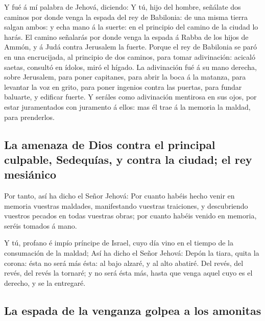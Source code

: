  Y fué á mí palabra de Jehová, diciendo: 
Y tú, hijo del hombre, señálate dos caminos por donde venga la espada
del rey de Babilonia: de una misma tierra salgan ambos: y echa mano á la
suerte: en el principio del camino de la ciudad lo harás.
 El camino señalarás por donde venga la espada á Rabba de
los hijos de Ammón, y á Judá contra Jerusalem la fuerte. 
Porque el rey de Babilonia se paró en una encrucijada, al principio de
dos caminos, para tomar adivinación: acicaló saetas, consultó en ídolos,
miró el hígado.  La adivinación fué á su mano derecha,
sobre Jerusalem, para poner capitanes, para abrir la boca á la matanza,
para levantar la voz en grito, para poner ingenios contra las puertas,
para fundar baluarte, y edificar fuerte.  Y seráles como
adivinación mentirosa en sus ojos, por estar juramentados con juramento
á ellos: mas él trae á la memoria la maldad, para prenderlos.

\hypertarget{la-amenaza-de-dios-contra-el-principal-culpable-sedequuxedas-y-contra-la-ciudad-el-rey-mesiuxe1nico}{%
\subsection{La amenaza de Dios contra el principal culpable, Sedequías,
y contra la ciudad; el rey
mesiánico}\label{la-amenaza-de-dios-contra-el-principal-culpable-sedequuxedas-y-contra-la-ciudad-el-rey-mesiuxe1nico}}

 Por tanto, así ha dicho el Señor Jehová: Por cuanto
habéis hecho venir en memoria vuestras maldades, manifestando vuestras
traiciones, y descubriendo vuestros pecados en todas vuestras obras; por
cuanto habéis venido en memoria, seréis tomados á mano.

 Y tú, profano é impío príncipe de Israel, cuyo día vino
en el tiempo de la consumación de la maldad;  Así ha
dicho el Señor Jehová: Depón la tiara, quita la corona: ésta no será más
ésta: al bajo alzaré, y al alto abatiré.  Del revés, del
revés, del revés la tornaré; y no será ésta más, hasta que venga aquel
cuyo es el derecho, y se la entregaré.

\hypertarget{la-espada-de-la-venganza-golpea-a-los-amonitas}{%
\subsection{La espada de la venganza golpea a los
amonitas}\label{la-espada-de-la-venganza-golpea-a-los-amonitas}}

